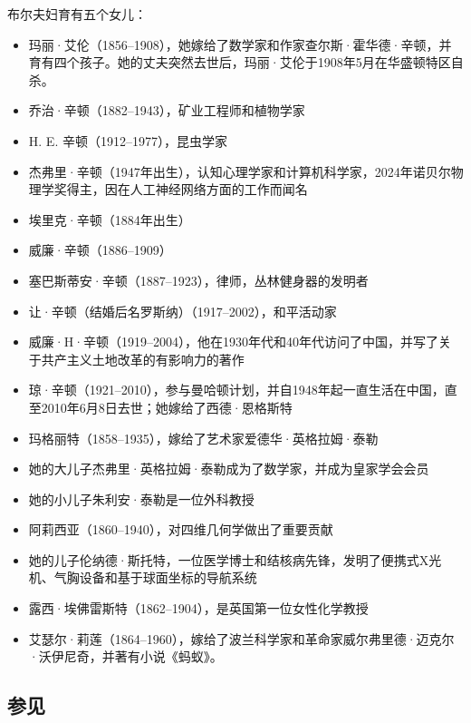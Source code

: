 布尔夫妇育有五个女儿：
\begin{itemize}
\item 玛丽·艾伦（1856–1908），她嫁给了数学家和作家查尔斯·霍华德·辛顿，并育有四个孩子。她的丈夫突然去世后，玛丽·艾伦于1908年5月在华盛顿特区自杀。
\item 乔治·辛顿（1882–1943），矿业工程师和植物学家
\item H. E. 辛顿（1912–1977），昆虫学家
\item 杰弗里·辛顿（1947年出生），认知心理学家和计算机科学家，2024年诺贝尔物理学奖得主，因在人工神经网络方面的工作而闻名
\item 埃里克·辛顿（1884年出生）
\item 威廉·辛顿（1886–1909）
\item 塞巴斯蒂安·辛顿（1887–1923），律师，丛林健身器的发明者
\item 让·辛顿（结婚后名罗斯纳）（1917–2002），和平活动家
\item 威廉·H·辛顿（1919–2004），他在1930年代和40年代访问了中国，并写了关于共产主义土地改革的有影响力的著作
\item 琼·辛顿（1921–2010），参与曼哈顿计划，并自1948年起一直生活在中国，直至2010年6月8日去世；她嫁给了西德·恩格斯特
\item 玛格丽特（1858–1935），嫁给了艺术家爱德华·英格拉姆·泰勒  
\item 她的大儿子杰弗里·英格拉姆·泰勒成为了数学家，并成为皇家学会会员
\item 她的小儿子朱利安·泰勒是一位外科教授
\item 阿莉西亚（1860–1940），对四维几何学做出了重要贡献  
\item 她的儿子伦纳德·斯托特，一位医学博士和结核病先锋，发明了便携式X光机、气胸设备和基于球面坐标的导航系统
\item 露西·埃佛雷斯特（1862–1904），是英国第一位女性化学教授
\item 艾瑟尔·莉莲（1864–1960），嫁给了波兰科学家和革命家威尔弗里德·迈克尔·沃伊尼奇，并著有小说《蚂蚁》。
\end{itemize}
\subsection{参见}
